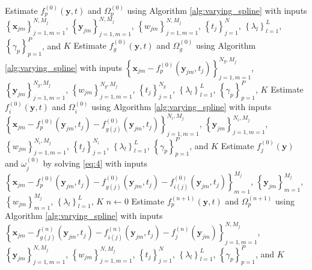 \documentclass[11pt,reqno]{article}
\theoremstyle{definition}
\begin{document}
\begin{algorithm}
  Estimate $f_{p}^{(0)}(\mathbf{y}, t)$ and $\Omega_{p}^{(0)}$ using Algorithm \ref{alg:varying_spline} with inputs $\left\{\mathbf{x}_{jm}\right\}_{j=1, m=1}^{N, M_j}$, $\left\{\mathbf{y}_{jm}\right\}_{j=1, m=1}^{N, M_j}$, $\left\{w_{jm}\right\}_{j=1, m=1}^{N, M_j}$, $\left\{t_{j}\right\}_{j=1}^{N}$, $\left\{\lambda_l\right\}_{l=1}^{L}$, $\left\{\gamma_p\right\}_{p=1}^{P}$, and $K$\;
   {
    Estimate $f_{g}^{(0)}(\mathbf{y}, t)$ and $\Omega_{g}^{(0)}$ using Algorithm \ref{alg:varying_spline} with inputs $\left\{\mathbf{x}_{jm} - f_{p}^{(0)}(\mathbf{y}_{jm}, t_j)\right\}_{j=1, m=1}^{N_g, M_j}$, $\left\{\mathbf{y}_{jm}\right\}_{j=1, m=1}^{N_g, M_j}$, $\left\{w_{jm}\right\}_{j=1, m=1}^{N_g, M_j}$, $\left\{t_j\right\}_{j=1}^{N_g}$, $\left\{\lambda_l\right\}_{l=1}^{L}$, $\left\{\gamma_p\right\}_{p=1}^{P}$, $K$\;
  }
   {
    Estimate $f_{i}^{(0)}(\mathbf{y}, t)$ and $\Omega_{i}^{(0)}$ using Algorithm \ref{alg:varying_spline} with inputs $\left\{\mathbf{x}_{jm} - f_{p}^{(0)}(\mathbf{y}_{jm}, t_j) - f_{g(j)}^{(0)}(\mathbf{y}_{jm}, t_j)\right\}_{j=1, m=1}^{N_i, M_j}$, $\left\{\mathbf{y}_{jm}\right\}_{j=1, m=1}^{N_i, M_j}$, $\left\{w_{jm}\right\}_{j=1, m=1}^{N_i, M_j}$, $\left\{t_j\right\}_{j=1}^{N_i}$, $\left\{\lambda_l\right\}_{l=1}^{L}$, $\left\{\gamma_p\right\}_{p=1}^{P}$, and $K$\;
  }
   {
    Estimate $f_{j}^{(0)}(\mathbf{y})$ and $\omega_{j}^{(0)}$ by solving \ref{eq:4} with inputs $\left\{\mathbf{x}_{jm} - f_{p}^{(0)}(\mathbf{y}_{jm}, t_j) - f_{g(j)}^{(0)}(\mathbf{y}_{jm}, t_j) - f_{i(j)}^{(0)}(\mathbf{y}_{jm}, t_j)\right\}_{m=1}^{M_j}$, $\left\{\mathbf{y}_{jm}\right\}_{m=1}^{M_j}$, $\left\{w_{jm}\right\}_{m = 1}^{M_j}$, $\left\{\lambda_l\right\}_{l=1}^{L}$, $K$\;
  }
  $n \gets 0$\;
   {
    Estimate $f_{p}^{(n+1)}(\mathbf{y}, t)$ and $\Omega_{p}^{(n+1)}$ using Algorithm \ref{alg:varying_spline} with inputs $\left\{\mathbf{x}_{jm} - f_{g(j)}^{(n)}(\mathbf{y}_{jm}, t_j) - f_{i(j)}^{(n)}(\mathbf{y}_{jm}, t_j) - f_j^{(n)}(\mathbf{y}_{jm})\right\}_{j=1, m=1}^{N, M_j}$, $\left\{\mathbf{y}_{jm}\right\}_{j=1, m=1}^{N, M_j}$, $\left\{w_{jm}\right\}_{j=1, m=1}^{N, M_j}$, $\left\{t_{j}\right\}_{j=1}^{N}$, $\left\{\lambda_l\right\}_{l=1}^{L}$, $\left\{\gamma_p\right\}_{p=1}^{P}$, and $K$\;
     {
}}
\end{algorithm}
\end{document}
